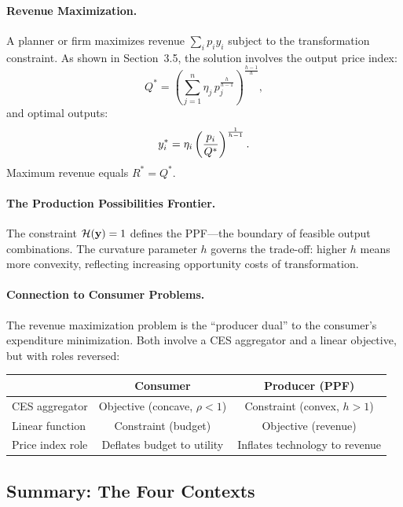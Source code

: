 \paragraph{Revenue Maximization.}
A planner or firm maximizes revenue $\sum_i p_i y_i$ subject to the transformation constraint. As shown in Section~3.5, the solution involves the output price index:
\begin{equation}
Q^* = \left( \sum_{j=1}^{n} \eta_j \, p_j^{\frac{h}{h-1}} \right)^{\frac{h-1}{h}},
\end{equation}
and optimal outputs:
\begin{equation}
y_i^{*} = \eta_i \left( \frac{p_i}{Q^*} \right)^{\frac{1}{h-1}}.
\end{equation}
Maximum revenue equals $R^* = Q^*$.

\paragraph{The Production Possibilities Frontier.}
The constraint $\mathcal{H}(\mathbf{y}) = 1$ defines the PPF---the boundary of feasible output combinations. The curvature parameter $h$ governs the trade-off: higher $h$ means more convexity, reflecting increasing opportunity costs of transformation.

\paragraph{Connection to Consumer Problems.}
The revenue maximization problem is the ``producer dual'' to the consumer's expenditure minimization. Both involve a CES aggregator and a linear objective, but with roles reversed:

\begin{center}
\renewcommand{\arraystretch}{1.3}
\begin{tabular}{@{}lcc@{}}
\toprule
& \textbf{Consumer} & \textbf{Producer (PPF)} \\
\midrule
CES aggregator & Objective (concave, $\rho < 1$) & Constraint (convex, $h > 1$) \\
Linear function & Constraint (budget) & Objective (revenue) \\
Price index role & Deflates budget to utility & Inflates technology to revenue \\
\bottomrule
\end{tabular}
\end{center}

\subsection{Summary: The Four Contexts}
\label{subsec:four-contexts}

